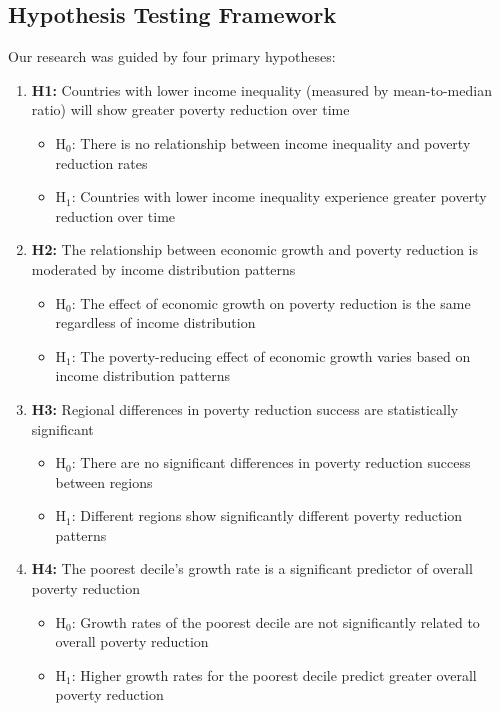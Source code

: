 \documentclass[12pt,a4paper]{article}
\begin{document}
\subsection{Hypothesis Testing Framework}
Our research was guided by four primary hypotheses:
\begin{enumerate}
    \item \textbf{H1:} Countries with lower income inequality (measured by mean-to-median ratio) will show greater poverty reduction over time
    \begin{itemize}
        \item H$_0$: There is no relationship between income inequality and poverty reduction rates
        \item H$_1$: Countries with lower income inequality experience greater poverty reduction over time
    \end{itemize}
    \item \textbf{H2:} The relationship between economic growth and poverty reduction is moderated by income distribution patterns
    \begin{itemize}
        \item H$_0$: The effect of economic growth on poverty reduction is the same regardless of income distribution
        \item H$_1$: The poverty-reducing effect of economic growth varies based on income distribution patterns
    \end{itemize}
    \item \textbf{H3:} Regional differences in poverty reduction success are statistically significant
    \begin{itemize}
        \item H$_0$: There are no significant differences in poverty reduction success between regions
        \item H$_1$: Different regions show significantly different poverty reduction patterns
    \end{itemize}
    \item \textbf{H4:} The poorest decile's growth rate is a significant predictor of overall poverty reduction
    \begin{itemize}
        \item H$_0$: Growth rates of the poorest decile are not significantly related to overall poverty reduction
        \item H$_1$: Higher growth rates for the poorest decile predict greater overall poverty reduction
    \end{itemize}
\end{enumerate}
\end{document}
